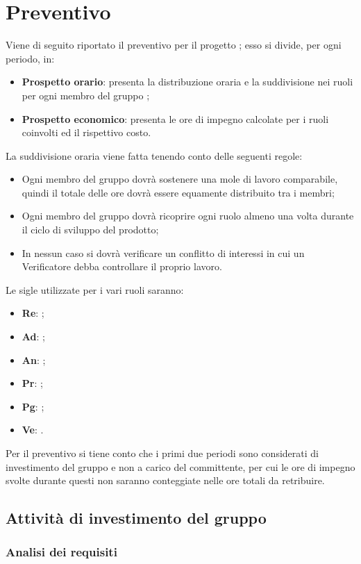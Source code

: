 \newpage
\section{Preventivo}

Viene di seguito riportato il preventivo per il progetto \NomeProgetto{}; esso si divide, per ogni periodo, in:
\begin{itemize}
	\item \textbf{Prospetto orario}: presenta la distribuzione oraria e la suddivisione nei ruoli per ogni membro del gruppo \gruppo;
	\item \textbf{Prospetto economico}: presenta le ore di impegno calcolate per i ruoli coinvolti ed il rispettivo costo.
\end{itemize}
La suddivisione oraria viene fatta tenendo conto delle seguenti regole:
\begin{itemize}
	\item Ogni membro del gruppo dovrà sostenere una mole di lavoro comparabile, quindi il totale delle ore dovrà essere equamente distribuito tra i membri;
	\item Ogni membro del gruppo dovrà ricoprire ogni ruolo almeno una volta durante il ciclo di sviluppo del prodotto;
	\item In nessun caso si dovrà verificare un conflitto di interessi in cui un Verificatore debba	controllare il proprio lavoro.
\end{itemize}
Le sigle utilizzate per i vari ruoli saranno:
\begin{itemize}
	\item \textbf{Re}: \RdP;
	\item \textbf{Ad}: \adm;
	\item \textbf{An}: \ana;
	\item \textbf{Pr}: \prog;
	\item \textbf{Pg}: \progr;
	\item \textbf{Ve}: \ver.
\end{itemize}
Per il preventivo si tiene conto che i primi due periodi sono considerati di investimento del gruppo e non a carico del committente, per cui le ore di impegno svolte durante questi non saranno conteggiate nelle ore totali da retribuire.
\newpage
\subsection{Attività di investimento del gruppo}
\subsubsection{Analisi dei requisiti}
